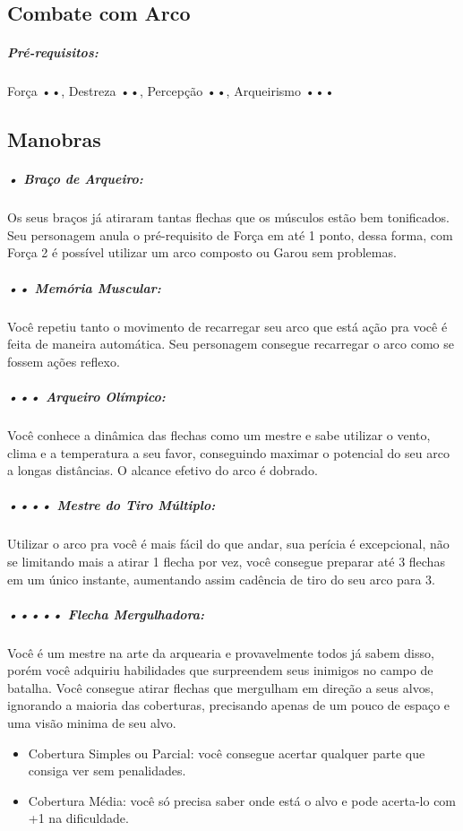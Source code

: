 
\subsection{\bf Combate com Arco \label{com:arquearia}}

\subparagraph*{\bf Pré-requisitos:} Força ••, Destreza ••, Percepção ••, Arqueirismo •••

\subsection{\bf Manobras}

\subparagraph{\bf • Braço de Arqueiro:}
Os seus braços já atiraram tantas flechas que os músculos estão bem tonificados. Seu personagem anula o pré-requisito de Força em até 1 ponto, dessa forma, com Força 2 é possível utilizar um arco composto ou Garou sem problemas.

\subparagraph{\bf •• Memória Muscular:}
Você repetiu tanto o movimento de recarregar seu arco que está ação pra você é feita de maneira automática. Seu personagem consegue recarregar o arco como se fossem ações reflexo.

\subparagraph{\bf ••• Arqueiro Olímpico:}
Você conhece a dinâmica das flechas como um mestre e sabe utilizar o vento, clima e a temperatura a seu favor, conseguindo maximar o potencial do seu arco a longas distâncias. O alcance efetivo do arco é dobrado.

\subparagraph{\bf •••• Mestre do Tiro Múltiplo:}
Utilizar o arco pra você é mais fácil do que andar, sua perícia é excepcional, não se limitando mais a atirar 1 flecha por vez, você consegue preparar até 3 flechas em um único instante, aumentando assim cadência de tiro do seu arco para 3.

\subparagraph{\bf ••••• Flecha Mergulhadora:}
Você é um mestre na arte da arquearia e provavelmente todos já sabem disso, porém você adquiriu habilidades que surpreendem seus inimigos no campo de batalha. Você consegue atirar flechas que mergulham em direção a seus alvos, ignorando a maioria das coberturas, precisando apenas de um pouco de espaço e uma visão minima de seu alvo.

\begin{itemize}[noitemsep]
\item Cobertura Simples ou Parcial: você consegue acertar qualquer parte que consiga ver sem penalidades.
\item Cobertura Média: você só precisa saber onde está o alvo e pode acerta-lo com +1 na dificuldade.
\end{itemize}